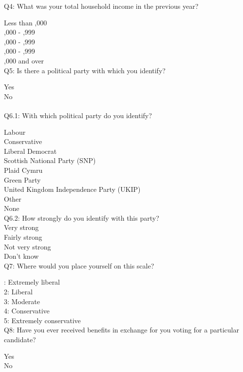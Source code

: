 \documentclass[11pt]{article}
\begin{document}
\noindent Q4: What was your total household income in the previous year?

\noindent Less than ,000\\
,000 - ,999\\
,000 - ,999\\
,000 - ,999\\
,000 and over\\

\noindent Q5: Is there a political party with which you identify?

\noindent Yes\\
No\\

\\

\noindent Q6.1: With which political party do you identify?

\noindent Labour\\
Conservative\\
Liberal Democrat\\
Scottish National Party (SNP)\\
Plaid Cymru\\
Green Party\\
United Kingdom Independence Party (UKIP)\\
Other\\
None\\

\noindent Q6.2: How strongly do you identify with this party?\\
\noindent Very strong\\
Fairly strong\\
Not very strong\\
Don’t know\\

\noindent Q7: Where would you place yourself on this scale?

: Extremely liberal\\
2: Liberal\\
3: Moderate\\
4: Conservative\\
5: Extremely conservative\\

\noindent Q8: Have you ever received benefits in exchange for you voting for a particular candidate?

\noindent Yes\\
No\\
\end{document}
